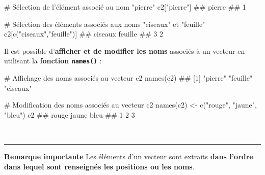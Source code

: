 \documentclass[12pt,twosided, notitlepage]{book}
\newenvironment{Shaded}{}{}
\newcommand{\CommentTok}[1]{\textcolor[rgb]{0.00,0.50,0.00}{#1}}
\newcommand{\KeywordTok}[1]{\textcolor[rgb]{0.00,0.00,1.00}{#1}}
\newcommand{\NormalTok}[1]{#1}
\newcommand{\StringTok}[1]{\textcolor[rgb]{0.00,0.50,0.50}{#1}}
\renewenvironment{Shaded}{\begin{snugshade}}{\end{snugshade}}
\begin{document}
\begin{Shaded}
\begin{Highlighting}[]
\CommentTok{# Sélection de l'élément associé au nom "pierre"}
\NormalTok{c2[}\StringTok{"pierre"}\NormalTok{]}
\NormalTok{  ## pierre }
\NormalTok{  ##      1}

\CommentTok{# Sélection des éléments associés aux noms "ciseaux" et "feuille"}
\NormalTok{c2[}\KeywordTok{c}\NormalTok{(}\StringTok{"ciseaux"}\NormalTok{,}\StringTok{"feuille"}\NormalTok{)]}
\NormalTok{  ## ciseaux feuille }
\NormalTok{  ##       3       2}
\end{Highlighting}
\end{Shaded}

Il est possible d'\textbf{afficher et de modifier les noms} associés à
un vecteur en utilisant la \textbf{fonction
\texttt{names()}} :

\begin{Shaded}
\begin{Highlighting}[]
\CommentTok{# Affichage des noms associés au vecteur c2}
\KeywordTok{names}\NormalTok{(c2)}
\NormalTok{  ## [1] "pierre"  "feuille" "ciseaux"}

\CommentTok{# Modification des noms associés au vecteur c2}
\KeywordTok{names}\NormalTok{(c2) <-}\StringTok{ }\KeywordTok{c}\NormalTok{(}\StringTok{"rouge"}\NormalTok{, }\StringTok{"jaune"}\NormalTok{, }\StringTok{"bleu"}\NormalTok{)}
\NormalTok{c2}
\NormalTok{  ## rouge jaune  bleu }
\NormalTok{  ##     1     2     3}
\end{Highlighting}
\end{Shaded}

~

\begin{center}\rule{0.5\linewidth}{\linethickness}\end{center}

\textbf{Remarque importante} Les éléments d'un vecteur sont extraits
\textbf{dans l'ordre dans lequel sont renseignés les positions ou les
noms}.
\end{document}
